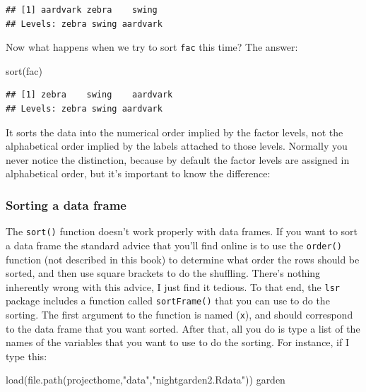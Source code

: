 \documentclass[
]{book}
\newenvironment{Shaded}{\begin{snugshade}}{\end{snugshade}}
\newcommand{\FunctionTok}[1]{\textcolor[rgb]{0.00,0.00,0.00}{#1}}
\newcommand{\NormalTok}[1]{#1}
\newcommand{\StringTok}[1]{\textcolor[rgb]{0.31,0.60,0.02}{#1}}
\begin{document}
\begin{verbatim}
## [1] aardvark zebra    swing   
## Levels: zebra swing aardvark
\end{verbatim}

Now what happens when we try to sort \texttt{fac} this time? The answer:

\begin{Shaded}
\begin{Highlighting}[]
\FunctionTok{sort}\NormalTok{(fac)}
\end{Highlighting}
\end{Shaded}

\begin{verbatim}
## [1] zebra    swing    aardvark
## Levels: zebra swing aardvark
\end{verbatim}

It sorts the data into the numerical order implied by the factor levels, not the alphabetical order implied by the labels attached to those levels. Normally you never notice the distinction, because by default the factor levels are assigned in alphabetical order, but it's important to know the difference:

\hypertarget{sortframe}{%
\subsubsection{Sorting a data frame}\label{sortframe}}

The \texttt{sort()} function doesn't work properly with data frames. If you want to sort a data frame the standard advice that you'll find online is to use the \texttt{order()} function (not described in this book) to determine what order the rows should be sorted, and then use square brackets to do the shuffling. There's nothing inherently wrong with this advice, I just find it tedious. To that end, the \texttt{lsr} package includes a function called \texttt{sortFrame()} that you can use to do the sorting. The first argument to the function is named (\texttt{x}), and should correspond to the data frame that you want sorted. After that, all you do is type a list of the names of the variables that you want to use to do the sorting. For instance, if I type this:

\begin{Shaded}
\begin{Highlighting}[]
\FunctionTok{load}\NormalTok{(}\FunctionTok{file.path}\NormalTok{(projecthome,}\StringTok{"data"}\NormalTok{,}\StringTok{"nightgarden2.Rdata"}\NormalTok{))}
\NormalTok{garden}
\end{Highlighting}
\end{Shaded}
\end{document}
